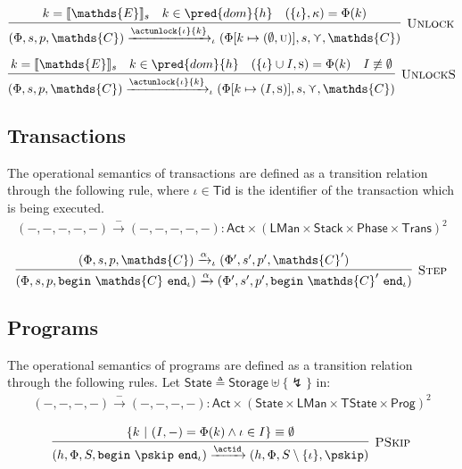 \[
\infer[\textsc{Unlock}]
{
	(\Phi, s, p, \mathds{C})
	\xrightarrow{\actunlock{\iota}{k}}_\iota
	(\Phi[k \mapsto (\emptyset, \textsc{u})], s, \curlyvee, \mathds{C})
}
{
	k = \llbracket \mathds{E} \rrbracket_s &
	k \in \pred{dom}{h} &
	(\{\iota\}, \kappa) = \Phi(k)
}
\]

\[
\infer[\textsc{UnlockS}]
{
	(\Phi, s, p, \mathds{C})
	\xrightarrow{\actunlock{\iota}{k}}_\iota
	(\Phi[k \mapsto (I, \textsc{s})], s, \curlyvee, \mathds{C})
}
{
	k = \llbracket \mathds{E} \rrbracket_s &
	k \in \pred{dom}{h} &
	(\{\iota\} \cup I, \textsc{s}) = \Phi(k) &
	I \not\equiv \emptyset
}
\]

\subsection{Transactions}
The operational semantics of transactions are defined as a transition relation through the following rule, where $\iota \in \mathsf{Tid}$ is the identifier of the transaction which is being executed.
\begin{gather*}
(-, -, -, -, -) \xrightarrow{-} (-, -, -, -, -) : \mathsf{Act} \times (\mathsf{LMan} \times \mathsf{Stack} \times \mathsf{Phase} \times \mathsf{Trans})^2
\end{gather*}

\[
\infer[\textsc{Step}]
{
	(\Phi, s, p, \mathtt{begin}\ \mathds{C}\ \mathtt{end}_\iota)
	\xrightarrow{\alpha}
	(\Phi', s', p', \mathtt{begin}\ \mathds{C}'\ \mathtt{end}_\iota)
}
{
	(\Phi, s, p, \mathds{C})
	\xrightarrow{\alpha}_\iota
	(\Phi', s', p', \mathds{C}')
}
\]

\subsection{Programs}


The operational semantics of programs are defined as a transition relation through the following rules. Let $\mathsf{State} \triangleq \mathsf{Storage} \uplus \{\lightning\}$ in:
\begin{gather*}
(-, -, -, -) \xrightarrow{-} (-, -, -, -) 
: \mathsf{Act} \times (\mathsf{State} \times \mathsf{LMan} \times \mathsf{TState} \times \mathsf{Prog})^2
\end{gather*}

\[
\infer[\textsc{PSkip}]
{
	 (h, \Phi, S, \mathtt{begin}\ \pskip\ \mathtt{end}_\iota)
	\xrightarrow{\actid}
	(h, \Phi, S \setminus \{\iota\}, \pskip)
}
{
	\{ k\ |\ (I, -) = \Phi(k) \land \iota \in I \} \equiv \emptyset
}
\]


